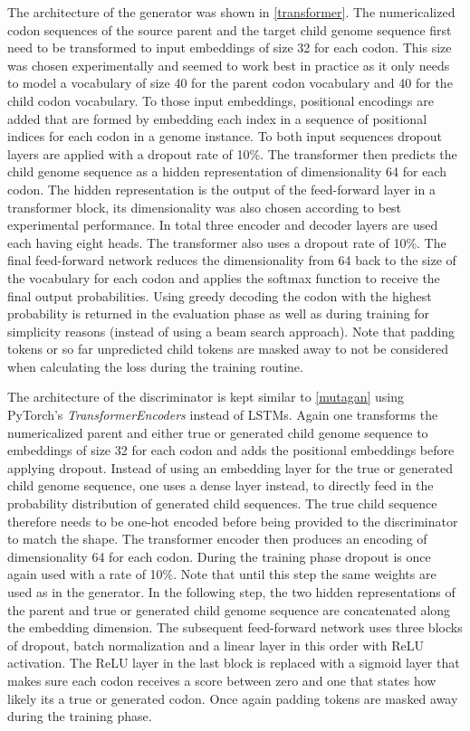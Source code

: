 The architecture of the generator was shown in \autoref{transformer}. The nu\-me\-ri\-ca\-li\-zed codon sequences of the source parent and the target child genome sequence first need to be transformed to input embeddings of size 32 for each codon. This size was chosen experimentally and seemed to work best in practice as it only needs to model a vocabulary of size 40 for the parent codon vocabulary and 40 for the child codon vocabulary. To those input embeddings, positional encodings are added that are formed by embedding each index in a sequence of positional indices for each codon in a genome instance. To both input sequences dropout layers are applied with a dropout rate of 10\%. The transformer then predicts the child genome sequence as a hidden re\-pre\-sen\-ta\-ti\-on of dimensionality 64 for each codon. The hidden representation is the output of the feed-forward layer in a transformer block, its dimensionality was also chosen according to best experimental performance. In total three encoder and decoder layers are used each having eight heads. The transformer also uses a dropout rate of 10\%. The final feed-forward network reduces the dimensionality from 64 back to the size of the vocabulary for each codon and applies the softmax function to receive the final output probabilities. Using greedy decoding the codon with the highest probability is returned in the evaluation phase as well as during training for simplicity reasons (instead of using a beam search approach). Note that padding tokens or so far unpredicted child tokens are masked away to not be considered when calculating the loss during the training routine.

The architecture of the discriminator is kept similar to \autoref{mutagan} using PyTorch's \textit{TransformerEncoders} instead of \acp{LSTM}. Again one transforms the numericalized parent and either true or generated child genome sequence to embeddings of size 32 for each codon and adds the positional embeddings before applying dropout. Instead of using an embedding layer for the true or generated child genome sequence, one uses a dense layer instead, to directly feed in the probability distribution of generated child sequences. The true child sequence therefore needs to be one-hot encoded before being provided to the discriminator to match the shape. The transformer encoder then produces an encoding of dimensionality 64 for each codon. During the training phase dropout is once again used with a rate of 10\%. Note that until this step the same weights are used as in the generator. In the following step, the two hidden representations of the parent and true or generated child genome sequence are concatenated along the embedding dimension. The subsequent feed-forward network uses three blocks of dropout, batch normalization and a linear layer in this order with \ac{ReLU} activation. The \ac{ReLU} layer in the last block is replaced with a sigmoid layer that makes sure each codon receives a score between zero and one that states how likely its a true or generated codon. Once again padding tokens are masked away during the training phase.

